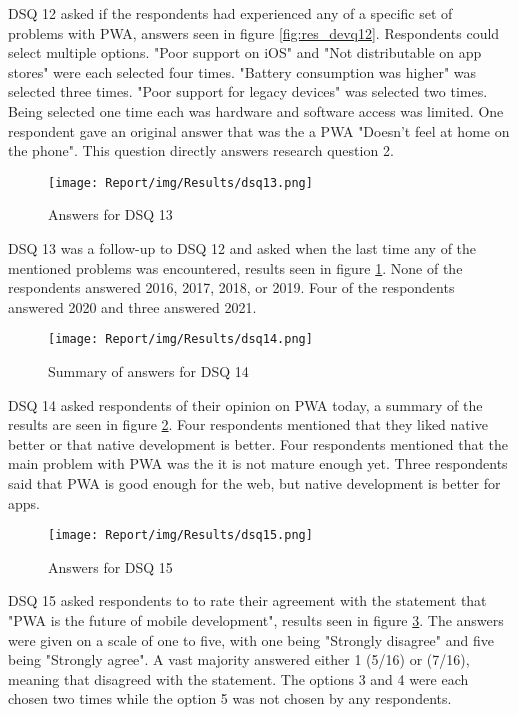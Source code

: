\documentclass[a4paper,12pt]{article}
\begin{document}
DSQ 12 asked if the respondents had experienced any of a specific set of problems with PWA, answers seen in figure \ref{fig:res_devq12}. Respondents could select multiple options. "Poor support on iOS" and "Not distributable on app stores" were each selected four times. "Battery consumption was higher" was selected three times. "Poor support for legacy devices" was selected two times. Being selected one time each was hardware and software access was limited. One respondent gave an original answer that was the a PWA "Doesn't feel at home on the phone". This question directly answers research question 2. 

\begin{figure}[ht!]
    \centering
    \texttt{[image: Report/img/Results/dsq13.png]}
    \caption{Answers for DSQ 13}
    \label{fig:res_devq13}
\end{figure}

DSQ 13 was a follow-up to DSQ 12 and asked when the last time any of the mentioned problems was encountered, results seen in figure \ref{fig:res_devq13}. None of the respondents answered 2016, 2017, 2018, or 2019. Four of the respondents answered 2020 and three answered 2021.

\begin{figure}[ht!]
    \centering
    \texttt{[image: Report/img/Results/dsq14.png]}
    \caption{Summary of answers for DSQ 14}
    \label{fig:res_devq14}
\end{figure}

\newpage
DSQ 14 asked respondents of their opinion on PWA today, a summary of the results are seen in figure \ref{fig:res_devq14}. Four respondents mentioned that they liked native better or that native development is better. Four respondents mentioned that the main problem with PWA was the it is not mature enough yet. Three respondents said that PWA is good enough for the web, but native development is better for apps. 

\begin{figure}[ht!]
    \centering
    \texttt{[image: Report/img/Results/dsq15.png]}
    \caption{Answers for DSQ 15}
    \label{fig:res_devq15}
\end{figure}

DSQ 15 asked respondents to to rate their agreement with the statement that "PWA is the future of mobile development", results seen in figure \ref{fig:res_devq15}. The answers were given on a scale of one to five, with one being "Strongly disagree" and five being "Strongly agree". A vast majority answered either 1 (5/16) or (7/16), meaning that disagreed with the statement. The options 3 and 4 were each chosen two times while the option 5 was not chosen by any respondents.
\end{document}
